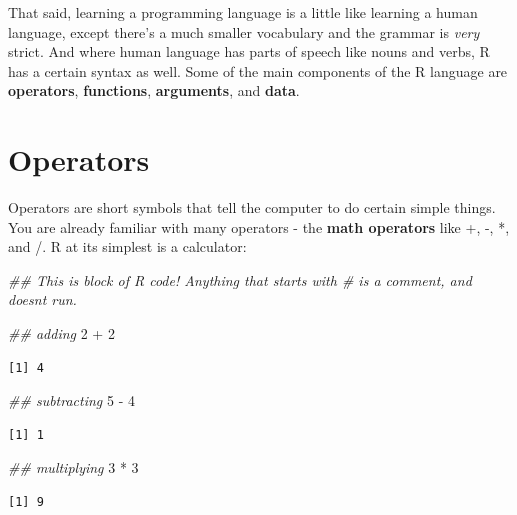 \documentclass[
  letterpaper,
  DIV=11,
  numbers=noendperiod]{scrreprt}
\newenvironment{Shaded}{\begin{snugshade}}{\end{snugshade}}
\newcommand{\DecValTok}[1]{\textcolor[rgb]{0.68,0.00,0.00}{#1}}
\newcommand{\DocumentationTok}[1]{\textcolor[rgb]{0.37,0.37,0.37}{\textit{#1}}}
\newcommand{\SpecialCharTok}[1]{\textcolor[rgb]{0.37,0.37,0.37}{#1}}
\begin{document}
That said, learning a programming language is a little like learning a
human language, except there's a much smaller vocabulary and the grammar
is \emph{very} strict. And where human language has parts of speech like
nouns and verbs, R has a certain syntax as well. Some of the main
components of the R language are \textbf{operators}, \textbf{functions},
\textbf{arguments}, and \textbf{data}.

\section{Operators}\label{operators}

Operators are short symbols that tell the computer to do certain simple
things. You are already familiar with many operators - the \textbf{math
operators} like +, -, *, and /. R at its simplest is a calculator:

\begin{Shaded}
\begin{Highlighting}[]
\DocumentationTok{\#\# This is block of R code! Anything that starts with \# is a comment, and doesn\textquotesingle{}t run.}

\DocumentationTok{\#\# adding}
\DecValTok{2} \SpecialCharTok{+} \DecValTok{2}
\end{Highlighting}
\end{Shaded}

\begin{verbatim}
[1] 4
\end{verbatim}

\begin{Shaded}
\begin{Highlighting}[]
\DocumentationTok{\#\# subtracting}
\DecValTok{5} \SpecialCharTok{{-}} \DecValTok{4}
\end{Highlighting}
\end{Shaded}

\begin{verbatim}
[1] 1
\end{verbatim}

\begin{Shaded}
\begin{Highlighting}[]
\DocumentationTok{\#\# multiplying}
\DecValTok{3} \SpecialCharTok{*} \DecValTok{3}
\end{Highlighting}
\end{Shaded}

\begin{verbatim}
[1] 9
\end{verbatim}
\end{document}
